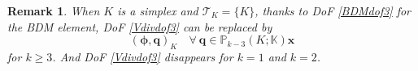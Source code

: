 \documentclass[10pt]{amsart}
\newtheorem{lemma}[theorem]{Lemma}
\newtheorem{remark}[theorem]{Remark}
\newcommand{\curl}{\operatorname{curl}}
\newcommand{\grad}{\operatorname{grad}}
\numberwithin{equation}{section}
\begin{document}
\begin{remark}\rm
When $K$ is a simplex and $\mathcal T_K=\{K\}$, thanks to DoF \eqref{BDMdof3} for the BDM element, DoF \eqref{Vdivdof3} can be replaced by 
\[
(\boldsymbol{\phi}, \boldsymbol{q})_K \quad\forall~\boldsymbol{q}\in \mathbb P_{k-3}(K;\mathbb K)\boldsymbol{x}
\]
for $k\geq3$.
And DoF \eqref{Vdivdof3} disappears for $k=1$ and $k=2$.
\end{remark}


\end{document}
